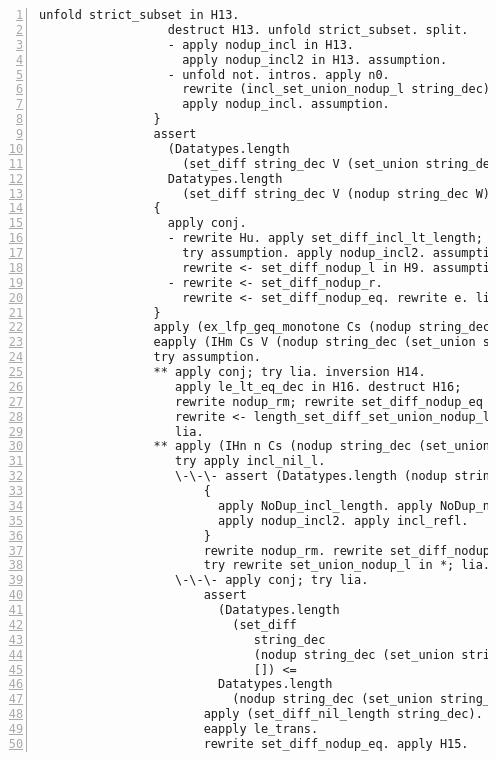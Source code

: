 \begin{lstlisting}[language=Coq, label={lst:thm32}, caption={Full proof of Theorem 3.2 in Coq}, numbers=left]
                  unfold strict_subset in H13.
                  destruct H13. unfold strict_subset. split.
                  - apply nodup_incl in H13.
                    apply nodup_incl2 in H13. assumption.
                  - unfold not. intros. apply n0.
                    rewrite (incl_set_union_nodup_l string_dec).
                    apply nodup_incl. assumption.
                }
                assert
                  (Datatypes.length
                    (set_diff string_dec V (set_union string_dec (nodup string_dec W) U)) <
                  Datatypes.length
                    (set_diff string_dec V (nodup string_dec W)) <= S m).
                {
                  apply conj.
                  - rewrite Hu. apply set_diff_incl_lt_length;
                    try assumption. apply nodup_incl2. assumption.
                    rewrite <- set_diff_nodup_l in H9. assumption.
                  - rewrite <- set_diff_nodup_r.
                    rewrite <- set_diff_nodup_eq. rewrite e. lia.
                }
                apply (ex_lfp_geq_monotone Cs (nodup string_dec V) h' f).
                eapply (IHm Cs V (nodup string_dec (set_union string_dec W U)) h');
                try assumption.
                ** apply conj; try lia. inversion H14.
                   apply le_lt_eq_dec in H16. destruct H16;
                   rewrite nodup_rm; rewrite set_diff_nodup_eq in *;
                   rewrite <- length_set_diff_set_union_nodup_l;
                   lia.
                ** apply (IHn n Cs (nodup string_dec (set_union string_dec W U)) [] h');
                   try apply incl_nil_l.
                   \-\-\- assert (Datatypes.length (nodup string_dec V) <= Datatypes.length V).
                       {
                         apply NoDup_incl_length. apply NoDup_nodup.
                         apply nodup_incl2. apply incl_refl.
                       }
                       rewrite nodup_rm. rewrite set_diff_nodup_eq in *;
                       try rewrite set_union_nodup_l in *; lia.
                   \-\-\- apply conj; try lia.
                       assert
                         (Datatypes.length
                           (set_diff
                              string_dec
                              (nodup string_dec (set_union string_dec W U))
                              []) <=
                         Datatypes.length
                           (nodup string_dec (set_union string_dec W U))).
                       apply (set_diff_nil_length string_dec).
                       eapply le_trans.
                       rewrite set_diff_nodup_eq. apply H15.

\end{lstlisting}

